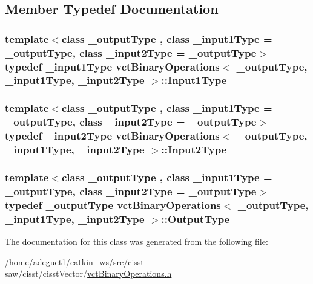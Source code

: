 \subsection{Member Typedef Documentation}
\hypertarget{classvct_binary_operations_a5e56a66a012d6a28c539a08a0021c45e}{
\subsubsection[{Input1\-Type}]{\setlength{\rightskip}{0pt plus 5cm}template$<$class \-\_\-output\-Type , class \-\_\-input1\-Type  = \-\_\-output\-Type, class \-\_\-input2\-Type  = \-\_\-output\-Type$>$ typedef \-\_\-input1\-Type {\bf vct\-Binary\-Operations}$<$ \-\_\-output\-Type, \-\_\-input1\-Type, \-\_\-input2\-Type $>$\-::{\bf Input1\-Type}}}\label{classvct_binary_operations_a5e56a66a012d6a28c539a08a0021c45e}
\hypertarget{classvct_binary_operations_a929119af557a04a16b4d854981e49e1b}{
\subsubsection[{Input2\-Type}]{\setlength{\rightskip}{0pt plus 5cm}template$<$class \-\_\-output\-Type , class \-\_\-input1\-Type  = \-\_\-output\-Type, class \-\_\-input2\-Type  = \-\_\-output\-Type$>$ typedef \-\_\-input2\-Type {\bf vct\-Binary\-Operations}$<$ \-\_\-output\-Type, \-\_\-input1\-Type, \-\_\-input2\-Type $>$\-::{\bf Input2\-Type}}}\label{classvct_binary_operations_a929119af557a04a16b4d854981e49e1b}
\hypertarget{classvct_binary_operations_afbfa2d453460e6ab5b67c26e2d3fc4b1}{
\subsubsection[{Output\-Type}]{\setlength{\rightskip}{0pt plus 5cm}template$<$class \-\_\-output\-Type , class \-\_\-input1\-Type  = \-\_\-output\-Type, class \-\_\-input2\-Type  = \-\_\-output\-Type$>$ typedef \-\_\-output\-Type {\bf vct\-Binary\-Operations}$<$ \-\_\-output\-Type, \-\_\-input1\-Type, \-\_\-input2\-Type $>$\-::{\bf Output\-Type}}}\label{classvct_binary_operations_afbfa2d453460e6ab5b67c26e2d3fc4b1}


The documentation for this class was generated from the following file\-:\begin{DoxyCompactItemize}
\item 
/home/adeguet1/catkin\-\_\-ws/src/cisst-\/saw/cisst/cisst\-Vector/\hyperlink{vct_binary_operations_8h}{vct\-Binary\-Operations.\-h}\end{DoxyCompactItemize}
